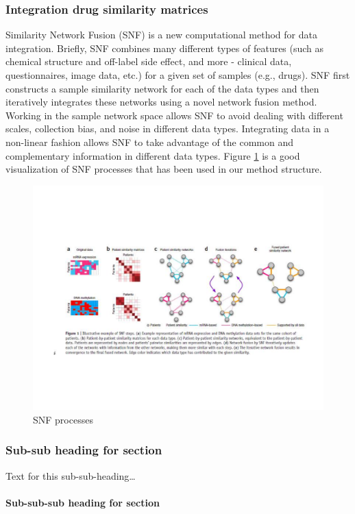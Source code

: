 \documentclass{bmcart}
\begin{document}
\subsubsection*{Integration drug similarity matrices}
Similarity Network Fusion (SNF)\cite{wang2014similarity} is a new computational method for data integration.  Briefly, SNF combines many different types of features (such as chemical structure and off-label side effect, and more - clinical data, questionnaires, image data, etc.) for a given set of samples (e.g., drugs). SNF first constructs a sample similarity network for each of the data types and then iteratively integrates these networks using a novel network fusion method. Working in the sample network space allows SNF to avoid dealing with different scales, collection bias, and noise in different data types. Integrating data in a non-linear fashion allows SNF to take advantage of the common and complementary information in different data types. Figure \ref{fs8} is a good visualization of SNF processes  that has been used in our method structure.


\begin{figure}[!h]
	\centering
	\includegraphics{SNF}
	\caption{SNF processes \cite{wang2014similarity}}
	\label{fs8}
\end{figure}


\subsubsection*{Sub-sub heading for section}
Text for this sub-sub-heading\ldots
\paragraph*{Sub-sub-sub heading for section}
\end{document}
